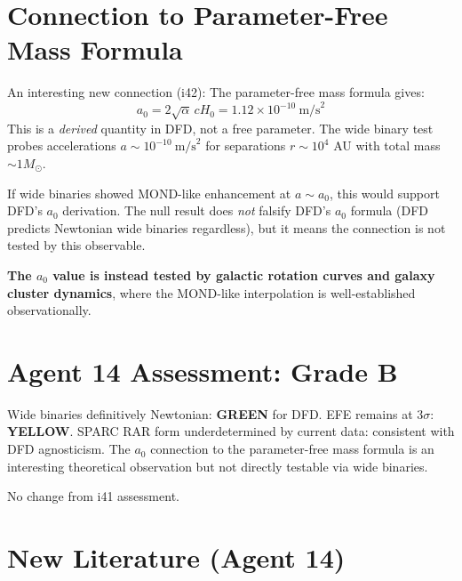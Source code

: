 \documentclass[11pt,a4paper]{article}
\newcommand{\GREEN}{\textcolor{dfdgreen}{\textbf{GREEN}}}
\newcommand{\YELLOW}{\textcolor{dfdyellow}{\textbf{YELLOW}}}
\begin{document}
\section{Connection to Parameter-Free Mass Formula}

An interesting new connection (i42): The parameter-free mass formula gives:
\begin{equation}
a_0 = 2\sqrt{\alpha}\,c H_0 = 1.12 \times 10^{-10}~\text{m/s}^2
\end{equation}
This is a \emph{derived} quantity in DFD, not a free parameter. The wide binary test probes accelerations $a \sim 10^{-10}~\text{m/s}^2$ for separations $r \sim 10^4$ AU with total mass $\sim 1 M_\odot$.

If wide binaries showed MOND-like enhancement at $a \sim a_0$, this would support DFD's $a_0$ derivation. The null result does \emph{not} falsify DFD's $a_0$ formula (DFD predicts Newtonian wide binaries regardless), but it means the connection is not tested by this observable.

\textbf{The $a_0$ value is instead tested by galactic rotation curves and galaxy cluster dynamics}, where the MOND-like interpolation is well-established observationally.

\section{Agent 14 Assessment: Grade B}

Wide binaries definitively Newtonian: \GREEN{} for DFD. EFE remains at $3\sigma$: \YELLOW{}. SPARC RAR form underdetermined by current data: consistent with DFD agnosticism. The $a_0$ connection to the parameter-free mass formula is an interesting theoretical observation but not directly testable via wide binaries.

No change from i41 assessment.

\section{New Literature (Agent 14)}
\end{document}
